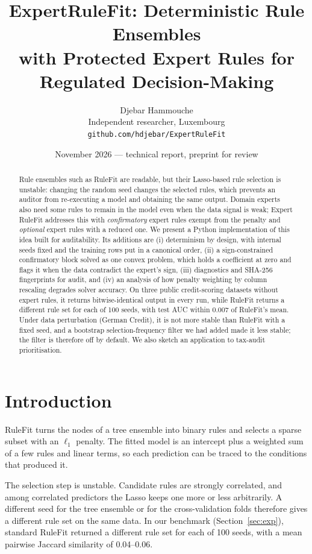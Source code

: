 \documentclass[11pt,a4paper]{article}
\title{\textbf{ExpertRuleFit: Deterministic Rule Ensembles\\with Protected Expert Rules for Regulated Decision-Making}}
\author{Djebar Hammouche\\Independent researcher, Luxembourg\\\texttt{github.com/hdjebar/ExpertRuleFit}}
\date{November 2026 --- technical report, preprint for review}
\theoremstyle{definition}\newtheorem{definition}{Definition}
\begin{document}
\maketitle

\begin{abstract}
Rule ensembles such as RuleFit are readable, but their Lasso-based rule selection is unstable: changing the random seed changes the selected rules, which prevents an auditor from re-executing a model and obtaining the same output. Domain experts also need some rules to remain in the model even when the data signal is weak; Expert RuleFit \citep{ebner_erf} addresses this with \emph{confirmatory} expert rules exempt from the penalty and \emph{optional} expert rules with a reduced one. We present a Python implementation of this idea built for auditability. Its additions are (i) determinism by design, with internal seeds fixed and the training rows put in a canonical order, (ii) a sign-constrained confirmatory block solved as one convex problem, which holds a coefficient at zero and flags it when the data contradict the expert's sign, (iii) diagnostics and SHA-256 fingerprints for audit, and (iv) an analysis of how penalty weighting by column rescaling degrades solver accuracy. On three public credit-scoring datasets without expert rules, it returns bitwise-identical output in every run, while RuleFit returns a different rule set for each of 100 seeds, with test AUC within 0.007 of RuleFit's mean. Under data perturbation (German Credit), it is not more stable than RuleFit with a fixed seed, and a bootstrap selection-frequency filter we had added made it less stable; the filter is therefore off by default. We also sketch an application to tax-audit prioritisation.
\end{abstract}

\section{Introduction}

RuleFit \citep{friedman2008} turns the nodes of a tree ensemble into binary rules and selects a sparse subset with an $\ell_1$ penalty. The fitted model is an intercept plus a weighted sum of a few rules and linear terms, so each prediction can be traced to the conditions that produced it.

The selection step is unstable. Candidate rules are strongly correlated, and among correlated predictors the Lasso keeps one more or less arbitrarily. A different seed for the tree ensemble or for the cross-validation folds therefore gives a different rule set on the same data. In our benchmark (Section~\ref{sec:exp}), standard RuleFit returned a different rule set for each of 100 seeds, with a mean pairwise Jaccard similarity of 0.04--0.06.
\end{document}
